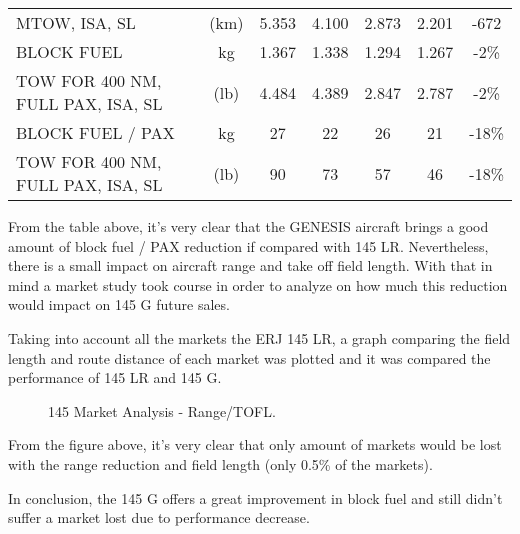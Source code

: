 \begin{table}[htbp]
\begin{tabular}{rcccccc}
    \multicolumn{1}{l}{MTOW, ISA, SL} & (km)  & 5.353 & 4.100 & 2.873 & 2.201 & -672 \\
    \multicolumn{1}{l}{BLOCK FUEL} & kg    & 1.367 & 1.338 & 1.294 & 1.267 & -2\% \\
    \multicolumn{1}{l}{TOW FOR 400 NM, FULL PAX, ISA, SL} & (lb)  & 4.484 & 4.389 & 2.847 & 2.787 & -2\% \\
    \multicolumn{1}{l}{BLOCK FUEL / PAX} & kg    & 27    & 22    & 26    & 21    & -18\% \\
    \multicolumn{1}{l}{TOW FOR 400 NM, FULL PAX, ISA, SL} & (lb)  & 90    & 73    & 57    & 46    & -18\% \\
    \bottomrule
    \end{tabular}%
  \label{tab:addlabel}%
\end{table}%


From the table above, it's very clear that the GENESIS aircraft brings a good amount of block fuel / PAX reduction if compared with 145 LR. Nevertheless, there is a small impact on aircraft range and take off field length. With that in mind a market study took course in order to analyze on how much this reduction would impact on 145 G future sales.

Taking into account all the markets the ERJ 145 LR, a graph comparing the field length and route distance of each market was plotted and it was compared the performance of 145 LR and 145 G.

\begin{figure}[H] %
\caption{145 Market Analysis - Range/TOFL.}
\label{fig:airportsTOFL}
\end{figure}

From the figure above, it's very clear that only amount of markets would be lost with the range reduction and field length (only 0.5\% of the markets).

In conclusion, the 145 G offers a great improvement in block fuel and still didn't suffer a market lost due to performance decrease.




